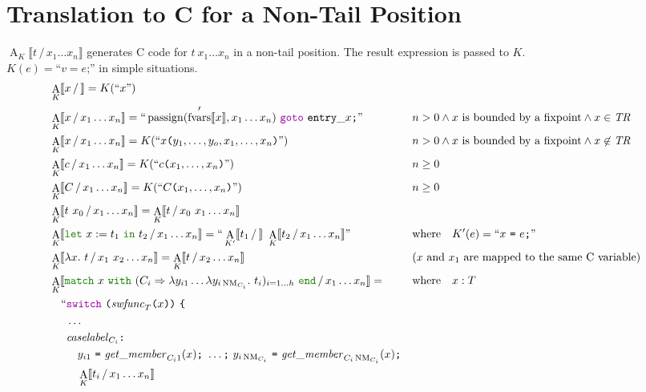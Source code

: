 \documentclass[a4paper,fleqn]{article}
\newcommand{\kwlet}{\mbox{\color{mygreen}\ttfamily let}}
\newcommand{\kwin}{\mbox{\color{mygreen}\ttfamily in}}
\newcommand{\kwmatch}{\mbox{\color{mygreen}\ttfamily match}}
\newcommand{\kwwith}{\mbox{\color{mygreen}\ttfamily with}}
\newcommand{\kwend}{\mbox{\color{mygreen}\ttfamily end}}
\newcommand{\lam}[2]{\lambda #1.~#2}
\newcommand{\lamB}[1]{\lambda #1.~}
\newcommand{\letin}[3]{\kwlet~#1:=#2~\kwin~#3}
\newcommand{\match}[4]{\kwmatch~#1~\kwwith~(#2 \Rightarrow #3)_{#4}~\kwend}
\DeclareMathOperator{\NM}{NM}
\newcommand{\BRA}[1]{\llbracket #1 \rrbracket}
\newcommand{\tr}{\mathit{TR}}
\newcommand{\dq}[1]{\text{``}#1\text{''}}
\newcommand{\ttparen}[1]{\texttt{(}#1\texttt{)}}
\newcommand{\ttlbrace}{\texttt{\{}}
\newcommand{\tteq}{\texttt{=}}
\newcommand{\ttsemi}{\texttt{;}}
\newcommand{\ttcolon}{\texttt{:}}
\newcommand{\kwswitch}{\mbox{\color{myviolet}\ttfamily switch}}
\newcommand{\kwgoto}{\mbox{\color{myviolet}\ttfamily goto}}
\DeclareMathOperator{\passign}{passign}
\DeclareMathOperator{\fvarsop}{fvars}
\newcommand{\fvarsd}[1]{\fvarsop'\BRA{#1}}
\DeclareMathOperator{\Aop}{A}
\newcommand{\A}[3]{\Aop_{#1}\BRA{#2\,/\,#3}}
\begin{document}
\section{Translation to C for a Non-Tail Position}\label{sec:AK}
\raggedright
$\A{K}{t}{x_1\dots x_n}$ generates C code for $t~x_1\dots x_n$ in a non-tail position.
The result expression is passed to $K$. \\
$K(e) = \dq{v = e\ttsemi}$ in simple situations.
\begin{align*}
  &\A{K}{x}{} = K(\dq{x}) \\
  &\A{K}{x}{x_1\dots x_n} = \dq{\passign(\fvarsd{x}, x_1 \dots x_n)~\kwgoto~\mathtt{entry\_}x\ttsemi}   && n > 0 \wedge \text{$x$ is bounded by a fixpoint} \wedge x \in \tr \\
  &\A{K}{x}{x_1\dots x_n} = K(\dq{x\ttparen{y_1,\dots,y_o,x_1,\dots, x_n}})                             && n > 0 \wedge \text{$x$ is bounded by a fixpoint} \wedge x \not\in \tr \\
  &\A{K}{c}{x_1\dots x_n} = K(\dq{c\ttparen{x_1,\dots, x_n}})                                   && n \geq 0 \\
  &\A{K}{C}{x_1\dots x_n} = K(\dq{C\ttparen{x_1,\dots, x_n}})                                   && n \geq 0 \\
  &\A{K}{t~x_0}{x_1\dots x_n} = \A{K}{t}{x_0~x_1\dots x_n} \\
  &\A{K}{\letin{x}{t_1}{t_2}}{x_1\dots x_n} = \dq{\A{K'}{t_1}{}~\A{K}{t_2}{x_1\dots x_n}}  && \text{where}\quad K'(e) = \dq{x~\tteq~e\ttsemi} \\
  &\A{K}{\lam{x}{t}}{x_1~x_2\dots x_n} = \A{K}{t}{x_2\dots x_n}                                  && \text{($x$ and $x_1$ are mapped to the same C variable)} \\
  &\A{K}{\match{x}{C_i}{\lambda y_{i1}\dots\lamB{y_{i\NM_{C_i}}}t_i}{i=1\dots h}}{x_1\dots x_n} =  && \text{where}\quad x : T \\
     & \quad\begin{alignedat}{2}
       \text{``} & \kwswitch~\ttparen{\mathit{swfunc}_T\ttparen{x}}~\ttlbrace \\
                 & \dots \\
                 & \mathit{caselabel}_{C_i}\ttcolon \\
                 & \quad y_{i1}~\tteq~\mathit{get\_member}_{C_i1}(x)\ttsemi ~\dots\ttsemi~ y_{i\NM_{C_i}}~\tteq~\mathit{get\_member}_{C_i\NM_{C_i}}(x)\ttsemi \\
                 & \quad \A{K}{t_i}{x_1\dots x_n} \\

\end{alignedat}
\end{align*}
\end{document}
